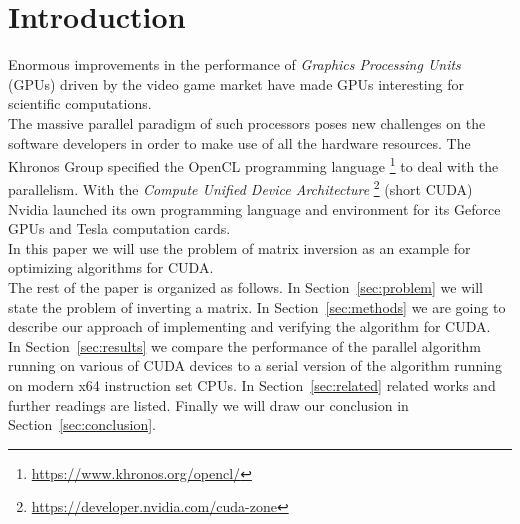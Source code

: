 


\section{Introduction}\label{sec:introduction}
Enormous improvements in the performance of \emph{Graphics Processing Units} (GPUs) driven by the video game market have made GPUs interesting for scientific computations. \\
The massive parallel paradigm of such processors poses new challenges on the software developers in order to make use of all the hardware resources. The Khronos Group specified the OpenCL programming language \footnote{\url{https://www.khronos.org/opencl/}} to deal with the parallelism. With the \emph{Compute Unified Device Architecture} \footnote{\url{https://developer.nvidia.com/cuda-zone}} (short CUDA) Nvidia launched its own programming language and environment for its Geforce GPUs and Tesla computation cards. \\
In this paper we will use the problem of matrix inversion as an example  for optimizing algorithms for CUDA.
\vspace{0.3cm}\\
The rest of the paper is organized as follows.  In Section~\ref{sec:problem} we will state the problem of inverting a matrix. In Section~\ref{sec:methods} we are going to describe our approach of implementing and verifying the algorithm for CUDA.\\
In Section~\ref{sec:results} we compare the performance of the parallel algorithm running on various of CUDA devices to a serial version of the algorithm running on modern x64 instruction set CPUs.  In Section~\ref{sec:related} related works and further readings are listed. Finally we will draw our conclusion in Section~\ref{sec:conclusion}.




